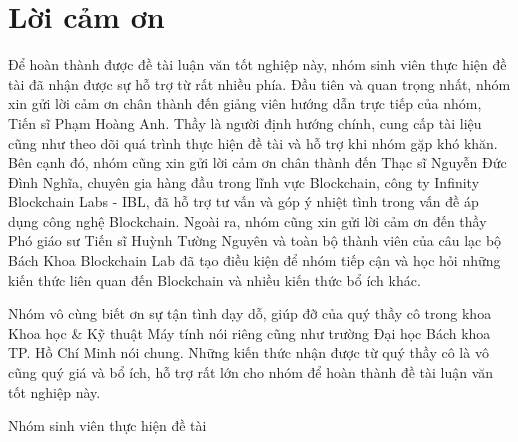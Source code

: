 \chapter*{Lời cảm ơn}
\onehalfspacing
\vspace{1.0cm}
Để hoàn thành được đề tài luận văn tốt nghiệp này, nhóm sinh viên thực hiện đề tài đã nhận được sự hỗ trợ từ rất nhiều phía. Đầu tiên và quan trọng nhất, nhóm xin gửi lời cảm ơn chân thành đến giảng viên hướng dẫn trực tiếp của nhóm, Tiến sĩ Phạm Hoàng Anh. Thầy là người định hướng chính, cung cấp tài liệu cũng như theo dõi quá trình thực hiện đề tài và hỗ trợ khi nhóm gặp khó khăn. Bên cạnh đó, nhóm cũng xin gửi lời cảm ơn chân thành đến Thạc sĩ Nguyễn Đức Đình Nghĩa, chuyên gia hàng đầu trong lĩnh vực Blockchain, công ty Infinity Blockchain Labs - IBL, đã hỗ trợ tư vấn và góp ý nhiệt tình trong vấn đề áp dụng công nghệ Blockchain. Ngoài ra, nhóm cũng xin gửi lời cảm ơn đến thầy Phó giáo sư Tiến sĩ Huỳnh Tường Nguyên và toàn bộ thành viên của câu lạc bộ Bách Khoa Blockchain Lab đã tạo điều kiện để nhóm tiếp cận và học hỏi những kiến thức liên quan đến Blockchain và nhiều kiến thức bổ ích khác.\par

Nhóm vô cùng biết ơn sự tận tình dạy dỗ, giúp đỡ của quý thầy cô trong khoa Khoa học \& Kỹ thuật Máy tính nói riêng cũng như trường Đại học Bách khoa TP. Hồ Chí Minh nói chung. Những kiến thức nhận được từ quý thầy cô là vô cũng quý giá và bổ ích, hỗ trợ rất lớn cho nhóm để hoàn thành đề tài luận văn tốt nghiệp này.
\begin{flushright}
 Nhóm sinh viên thực hiện đề tài 
\end{flushright}

\bigskip